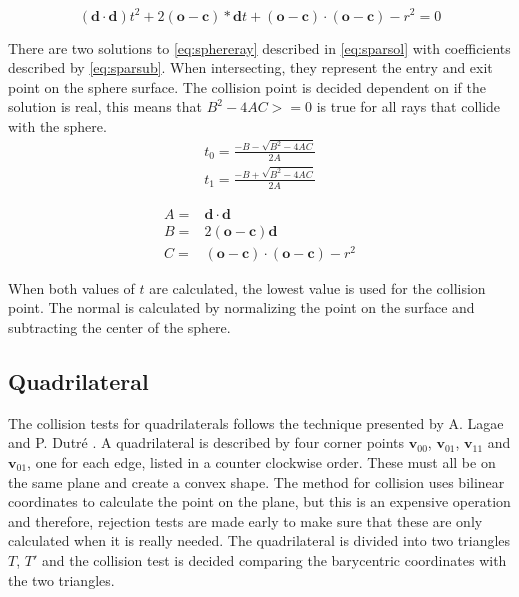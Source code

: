 \documentclass[a4paper, 12pt]{report}
\begin{document}
\begin{equation} \label{eq:sphereray}
(\mathbf{d} \cdot \mathbf{d})t^2 + 2(\mathbf{o} - \mathbf{c}) * \mathbf{d} t + (\mathbf{o} - \mathbf{c}) \cdot (\mathbf{o} - \mathbf{c}) - r^2=0
\end{equation}

There are two solutions to \autoref{eq:sphereray} described in \autoref{eq:sparsol} with coefficients described by \autoref{eq:sparsub}.
When intersecting, they represent the entry and exit point on the sphere surface.
The collision point is decided dependent on if the solution is real, this means that $B^2 - 4 A C >= 0$ is true for all rays that collide with the sphere.
\begin{subequations} \label{eq:sparsol}
\begin{align} 
t_0 = \frac{ -B - \sqrt{B^2 - 4 A C} }{ 2 A }\\
t_1 = \frac{ -B + \sqrt{B^2 - 4 A C} }{ 2 A }
\end{align}
\end{subequations}

\begin{subequations} \label{eq:sparsub}
\begin{align}
A =& \mathbf{d} \cdot \mathbf{d} \\
B =& 2(\mathbf{o} - \mathbf{c}) \mathbf{d} \\
C =& (\mathbf{o} - \mathbf{c}) \cdot (\mathbf{o} - \mathbf{c}) - r^2
\end{align}
\end{subequations}

When both values of $t$ are calculated, the lowest value is used for the collision point. 
The normal is calculated by normalizing the point on the surface and subtracting the center of the sphere.

\subsection{Quadrilateral}
The collision tests for quadrilaterals follows the technique presented by A. Lagae and P. Dutr\'{e} \cite{quadrilateral}.
A quadrilateral is described by four corner points $ \mathbf{v}_{00} $, $ \mathbf{v}_{01}$, $ \mathbf{v}_{11} $ and $ \mathbf{v}_{01} $, one for each edge, listed in a counter clockwise order.
These must all be on the same plane and create a convex shape.
The method for collision uses bilinear coordinates to calculate the point on the plane, but this is an expensive operation and therefore, rejection tests are made early to make sure that these are only calculated when it is really needed.
The quadrilateral is divided into two triangles $ T $, $ T' $ and the collision test is decided comparing the barycentric coordinates with the two triangles. \\
\end{document}

